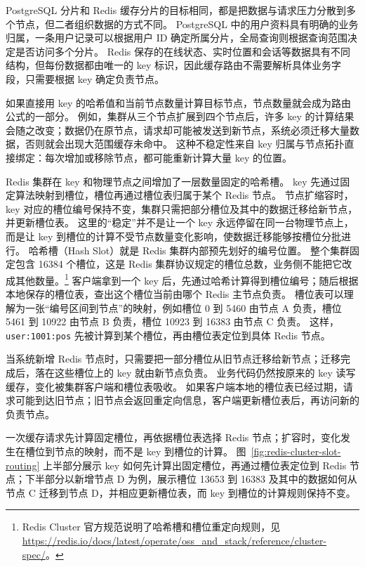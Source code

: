PostgreSQL 分片和 Redis 缓存分片的目标相同，都是把数据与请求压力分散到多个节点，但二者组织数据的方式不同。
PostgreSQL 中的用户资料具有明确的业务归属，一条用户记录可以根据用户 ID 确定所属分片，全局查询则根据查询范围决定是否访问多个分片。
Redis 保存的在线状态、实时位置和会话等数据具有不同结构，但每份数据都由唯一的 key 标识，因此缓存路由不需要解析具体业务字段，只需要根据 key 确定负责节点。

如果直接用 key 的哈希值和当前节点数量计算目标节点，节点数量就会成为路由公式的一部分。
例如，集群从三个节点扩展到四个节点后，许多 key 的计算结果会随之改变；数据仍在原节点，请求却可能被发送到新节点，系统必须迁移大量数据，否则就会出现大范围缓存未命中。
这种不稳定性来自 key 归属与节点拓扑直接绑定：每次增加或移除节点，都可能重新计算大量 key 的位置。

Redis 集群在 key 和物理节点之间增加了一层数量固定的哈希槽。
key 先通过固定算法映射到槽位，槽位再通过槽位表归属于某个 Redis 节点。
节点扩缩容时，key 对应的槽位编号保持不变，集群只需把部分槽位及其中的数据迁移给新节点，并更新槽位表。
这里的“稳定”并不是让一个 key 永远停留在同一台物理节点上，而是让 key 到槽位的计算不受节点数量变化影响，使数据迁移能够按槽位分批进行。
哈希槽（Hash Slot）就是 Redis 集群内部预先划好的编号位置。
整个集群固定包含 16384 个槽位，这是 Redis 集群协议规定的槽位总数，业务侧不能把它改成其他数量。\footnote{Redis Cluster 官方规范说明了哈希槽和槽位重定向规则，见 \url{https://redis.io/docs/latest/operate/oss_and_stack/reference/cluster-spec/}。}
客户端拿到一个 key 后，先通过哈希计算得到槽位编号；随后根据本地保存的槽位表，查出这个槽位当前由哪个 Redis 主节点负责。
槽位表可以理解为一张“编号区间到节点”的映射，例如槽位 0 到 5460 由节点 A 负责，槽位 5461 到 10922 由节点 B 负责，槽位 10923 到 16383 由节点 C 负责。
这样，\texttt{user:1001:pos} 先被计算到某个槽位，再由槽位表定位到具体 Redis 节点。

当系统新增 Redis 节点时，只需要把一部分槽位从旧节点迁移给新节点；迁移完成后，落在这些槽位上的 key 就由新节点负责。
业务代码仍然按原来的 key 读写缓存，变化被集群客户端和槽位表吸收。
如果客户端本地的槽位表已经过期，请求可能到达旧节点；旧节点会返回重定向信息，客户端更新槽位表后，再访问新的负责节点。

一次缓存请求先计算固定槽位，再依据槽位表选择 Redis 节点；扩容时，变化发生在槽位到节点的映射，而不是 key 到槽位的计算。
图~\ref{fig:redis-cluster-slot-routing} 上半部分展示 key 如何先计算出固定槽位，再通过槽位表定位到 Redis 节点；下半部分以新增节点 D 为例，展示槽位 13653 到 16383 及其中的数据如何从节点 C 迁移到节点 D，并相应更新槽位表，而 key 到槽位的计算规则保持不变。

